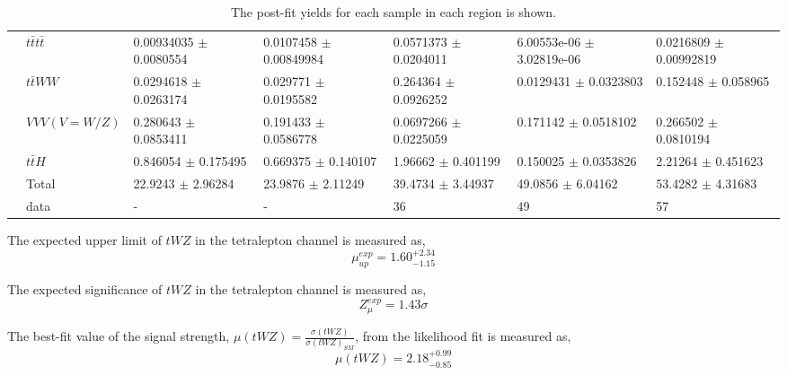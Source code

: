 \begin{table}[h!]
{\begin{tabular}{|l|l|l|l|l|l|l|}
                        & $t\bar{t}t\bar{t}$          & 0.00934035 $\pm$ 0.0080554    & 0.0107458 $\pm$ 0.00849984  & 0.0571373 $\pm$ 0.0204011     & 6.00553e-06 $\pm$ 3.02819e-06 & 0.0216809 $\pm$ 0.00992819 \\
                        & $t\bar{t}WW$          & 0.0294618 $\pm$ 0.0263174     & 0.029771 $\pm$ 0.0195582    & 0.264364 $\pm$ 0.0926252      & 0.0129431 $\pm$ 0.0323803     & 0.152448 $\pm$ 0.058965    \\
                        & $VVV (V = W/Z)$          & 0.280643 $\pm$ 0.0853411      & 0.191433 $\pm$ 0.0586778    & 0.0697266 $\pm$ 0.0225059     & 0.171142 $\pm$ 0.0518102      & 0.266502 $\pm$ 0.0810194   \\
                        & $t\bar{t}H$           & 0.846054 $\pm$ 0.175495       & 0.669375 $\pm$ 0.140107     & 1.96662 $\pm$ 0.401199        & 0.150025 $\pm$ 0.0353826      & 2.21264 $\pm$ 0.451623     \\\hline
                        & Total         & 22.9243 $\pm$ 2.96284         & 23.9876 $\pm$ 2.11249       & 39.4734 $\pm$ 3.44937         & 49.0856 $\pm$ 6.04162         & 53.4282 $\pm$ 4.31683      \\ \hline
                        & data          & -                                         & -                                      & 36                                         & 49                                         & 57                                      \\ \hline
\end{tabular}}
\caption{The post-fit yields for each sample in each region is shown.}
\label{tab:4Lep-PostFit-Yields}
\end{table}

The expected upper limit of $tWZ$ in the tetralepton channel is measured as,
\begin{equation}
  \mu_{up}^{exp} =   1.60^{+2.34}_{-1.15}
\end{equation}

The expected significance of $tWZ$ in the tetralepton channel is measured as,
\begin{equation}
 Z_{\mu}^{exp} =   1.43\sigma
\end{equation}

The best-fit value of the signal strength, $\mu (tWZ)= \frac{\sigma(tWZ)}{\sigma(tWZ)_{SM}}$, from the likelihood fit is measured as,
\begin{equation}
  \mu (tWZ) =   2.18^{+0.99}_{-0.85}
\end{equation}

